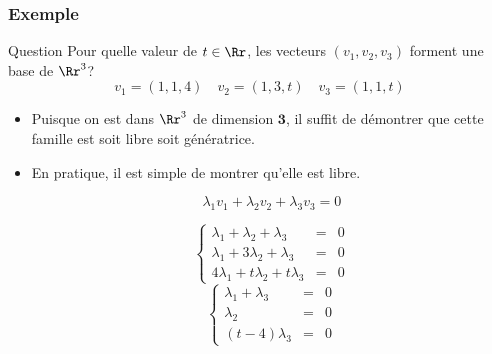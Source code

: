 \documentclass[dvipsnames]{beamer}
\begin{document}
\begin{frame}[t]
  \frametitle{Exemple}
 \begin{block}{Question}
   \small
   Pour quelle valeur de $t\in \Rr$, les vecteurs $(v_1, v_2, v_3)$ forment
   une base de $\Rr^3$?
   $$
   v_1 = (1,1,4) \quad v_2 = (1,3,t) \quad v_3=(1,1,t)
   $$
 \end{block} 
 \begin{itemize}
   \small
 \item Puisque on est dans $\Rr^3$ de dimension $\mathbf{3}$, il suffit de
   démontrer que cette famille est soit libre soit génératrice.
 \item En pratique, il est simple de montrer qu'elle est libre.

   \begin{equation*}
     \lambda_1 v_1 + \lambda_2 v_2 +\lambda_3 v_3 = 0
   \end{equation*}

   \begin{equation*}
     \left\{
       \begin{array}{lll}
         \lambda_1  + \lambda_2 + \lambda_3 & = & 0\\
         \lambda_1 + 3\lambda_2 + \lambda_3 & = & 0\\
         4\lambda_1 + t\lambda_2 + t \lambda_3 & = & 0
         
       \end{array}
     \right.
   \end{equation*}
   \begin{equation*}
     \left\{
       \begin{array}{lll}
         \lambda_1  +  \lambda_3 & = & 0\\
         \lambda_2  & = & 0\\
         (t-4) \lambda_3 & = & 0
       \end{array}
     \right.
   \end{equation*}
 \end{itemize}
\end{frame}
\end{document}
